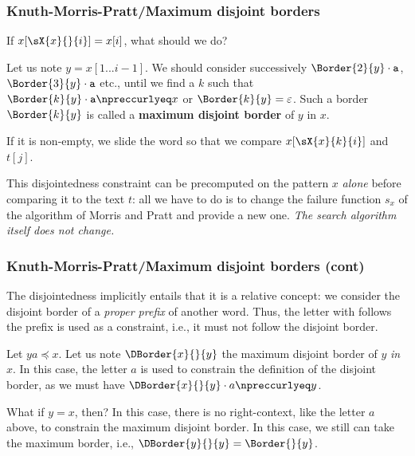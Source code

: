%
\begin{frame}
\frametitle{Knuth-Morris-Pratt/Maximum disjoint borders}

If \(x[\sX{x}{}{i}] = x[i]\), what should we do?

\bigskip

Let us note \(y=x[1...i-1]\). We should consider successively
\(\Border{2}{y} \cdot \texttt{a}\), \(\Border{3}{y} \cdot \texttt{a}\)
etc., until we find a \(k\) such that \(\Border{k}{y} \cdot \texttt{a}
\npreccurlyeq x\) or \(\Border{k}{y} = \varepsilon\). Such a border
\(\Border{k}{y}\) is called a \textbf{maximum disjoint border} of
\(y\) in \(x\).

\bigskip

If it is non-empty, we slide the word so that we compare
\(x[\sX{x}{k}{i}]\) and \(t[j]\).

\bigskip

This disjointedness constraint can be precomputed on the pattern \(x\)
\emph{alone} before comparing it to the text \(t\): all we have to do
is to change the failure function \(s_{x}\) of the algorithm of Morris
and Pratt and provide a new one. \emph{The search algorithm itself
  does not change.}

\end{frame}

%
\begin{frame}
\frametitle{Knuth-Morris-Pratt/Maximum disjoint borders (cont)}

The disjointedness implicitly entails that it is a relative concept:
we consider the disjoint border of a \emph{proper prefix} of another
word. Thus, the letter with follows the prefix is used as a
constraint, i.e., it must not follow the disjoint border.

\bigskip

Let \(ya \preccurlyeq x\). Let us note \(\DBorder{x}{}{y}\) the
maximum disjoint border of \(y\) \emph{in \(x\)}. In this case, the
letter \(a\) is used to constrain the definition of the disjoint
border, as we must have \(\DBorder{x}{}{y} \cdot a \npreccurlyeq y\).

\bigskip

What if \(y = x\), then? In this case, there is no right-context, like
the letter \(a\) above, to constrain the maximum disjoint border. In
this case, we still can take the maximum border, i.e., \(\DBorder{y}{}{y} =
\Border{}{y}\).

\end{frame}

